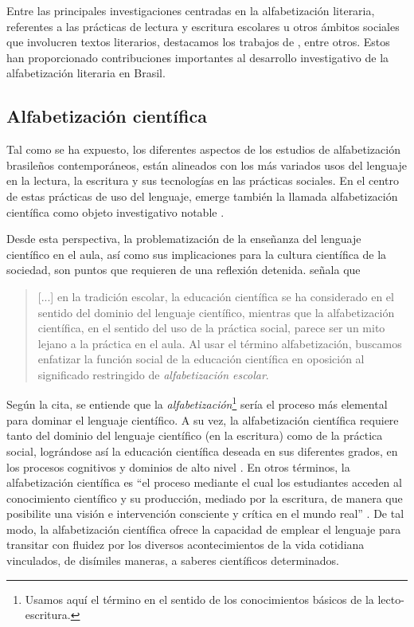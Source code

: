\documentclass[spanish]{textolivre}
\begin{document}
Entre las principales investigaciones centradas en la alfabetización literaria, referentes a las prácticas de lectura y escritura escolares u otros ámbitos sociales que involucren textos literarios, destacamos los trabajos de \textcite{lajolo_leitura_1991, soares_escolarizacao_1999, paulino_letramento_2001, cosson_letramento_2009}, entre otros. Estos han proporcionado contribuciones importantes al desarrollo investigativo de la alfabetización literaria en Brasil. 

\subsection{Alfabetización científica}\label{sec-cientifica}
Tal como se ha expuesto, los diferentes aspectos de los estudios de alfabetización brasileños contemporáneos, están alineados con los más variados usos del lenguaje en la lectura, la escritura y sus tecnologías en las prácticas sociales. En el centro de estas prácticas de uso del lenguaje, emerge también la llamada alfabetización científica como objeto investigativo notable \cite{santos_educacao_2007, cunha_alfabetizacao_2017}.   

Desde esta perspectiva, la problematización de la enseñanza del lenguaje científico en el aula, así como sus implicaciones para la cultura científica de la sociedad, son puntos que requieren de una reflexión detenida. \textcite[p. 479]{santos_educacao_2007} señala que

\begin{quote}
    [...] en la tradición escolar, la educación científica se ha considerado en el sentido del dominio del lenguaje científico, mientras que la alfabetización científica, en el sentido del uso de la práctica social, parece ser un mito lejano a la práctica en el aula. Al usar el término alfabetización, buscamos enfatizar la función social de la educación científica en oposición al significado restringido de \textit{alfabetización escolar}. 
\end{quote}

Según la cita, se entiende que la \textit{alfabetización}\footnote{Usamos aquí el término en el sentido de los conocimientos básicos de la lecto-escritura.} sería el proceso más elemental para dominar el lenguaje científico. A su vez, la alfabetización científica requiere tanto del dominio del lenguaje científico (en la escritura) como de la práctica social, lográndose así la educación científica deseada en sus diferentes grados, en los procesos cognitivos y dominios de alto nivel \cite{santos_educacao_2007}. En otros términos, la alfabetización científica es “el proceso mediante el cual los estudiantes acceden al conocimiento científico y su producción, mediado por la escritura, de manera que posibilite una visión e intervención consciente y crítica en el mundo real” \cite[p. 7]{silva_ciencia_2018}. De tal modo, la alfabetización científica ofrece la capacidad de emplear el lenguaje para transitar con fluidez por los diversos acontecimientos de la vida cotidiana vinculados, de disímiles maneras, a saberes científicos determinados.
\end{document}
